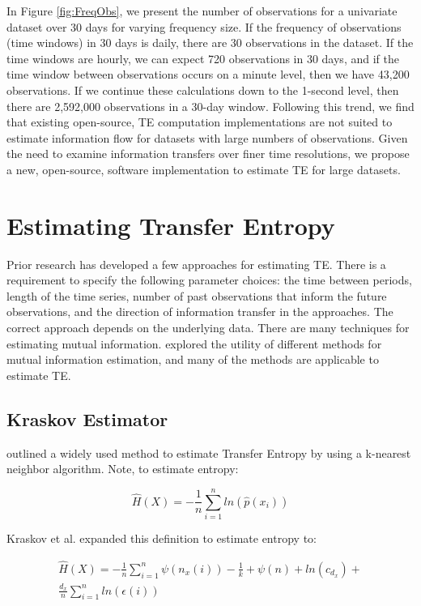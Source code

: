 In Figure \ref{fig:FreqObs}, we present the number of observations for a univariate dataset over 30 days for varying frequency size.  If the frequency of observations (time windows) in 30 days is daily,  there are 30 observations in the dataset.  If the time windows are hourly, we can expect 720 observations in 30 days, and if the time window between observations occurs on a minute level, then we have 43,200 observations.  If we continue these calculations down to the 1-second level, then there are 2,592,000 observations in a 30-day window.  Following this trend, we find that existing open-source, TE computation implementations are not suited to estimate information flow for datasets with large numbers of observations.  Given the need to examine information transfers over finer time resolutions, we propose a new, open-source, software implementation to estimate TE for large datasets.

\section{Estimating Transfer Entropy} \label{intro:estimateTE}

Prior research has developed a few approaches for estimating TE. There is a requirement to specify the following parameter choices: the time between periods, length of the time series, number of past observations that inform the future observations, and the direction of information transfer in the approaches. The correct approach depends on the underlying data. There are many techniques for estimating mutual information. \cite{EstimatingTE} explored the utility of different methods for mutual information estimation, and many of the methods are applicable to estimate TE.

\subsection{Kraskov Estimator} \label{intro:Kraskov}


\cite{kraskovEstimator} outlined a widely used method  to estimate Transfer Entropy by using a k-nearest neighbor algorithm.  Note, to estimate entropy:

\begin{equation}
\hat{H}(X) = - \frac{1}{n} \sum^n_{i=1} ln (\hat{p}(x_i)) 
\end{equation}

\noindent Kraskov et al. expanded this definition to estimate entropy to:

\setlength{\arraycolsep}{0.0em}
\begin{eqnarray}
\hat{H}(X) = - \frac{1}{n} \sum^n_{i=1} \psi(n_x(i)) - \frac{1}{k} + \psi(n) + ln (c_{d_x}) + \nonumber\\
 \frac{d_x}{n} \sum^n_{i=1} ln (\epsilon(i))
\end{eqnarray}
\setlength{\arraycolsep}{1pt}


